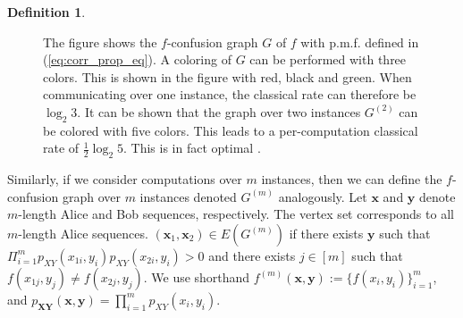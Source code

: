 \documentclass[journal, onecolumn, draftcls]{IEEEtran}
\theoremstyle{definition}
\newtheorem{definition}{Definition}
\newcommand{\vs}{\vspace{-0.1in}}
\newcommand{\bfy}{\mathbf{y}}
\newcommand{\bfX}{\mathbf{X}}
\newcommand{\bfY}{\mathbf{Y}}
\newcommand{\bfx}{\mathbf{x}}
\begin{document}
\begin{definition}
\begin{figure}[!t]
\begin{center}
\end{center}
\vs
\caption{\label{fig:pentagon} {\small The figure shows the $f$-confusion graph $G$ of $f$ with p.m.f. defined in (\ref{eq:corr_prop_eq}). A coloring of $G$ can be performed with three colors. This is shown in the figure with red, black and green. When communicating over one instance, the classical rate can therefore be $\log_2 3$. It can be shown that the graph over two instances $G^{(2)}$ can be colored with five colors. This leads to a per-computation classical rate of $\frac{1}{2} \log_2 5$. This is in fact optimal \cite{Witsenhausen_76,lovasz1979shannon}.}}
\vs
\end{figure}


Similarly, if we consider computations over $m$ instances, then we can define the $f$-confusion graph over $m$ instances denoted $G^{(m)}$ analogously. Let $\bfx$ and $\bfy$ denote $m$-length Alice and Bob sequences, respectively. The vertex set corresponds to all $m$-length Alice sequences. $(\bfx_1,\bfx_2) \in E(G^{(m)})$ if there exists $\bfy$ such that $\Pi_{i=1}^m p_{XY}(x_{1i},y_i) p_{XY}(x_{2i}, y_i) > 0$ and there exists $j \in [m]$ such that $f(x_{1j},y_j) \neq f(x_{2j},y_j)$. %
We use shorthand $f^{(m)}(\bfx,\bfy):= \{f(x_i,y_i)\}_{i=1}^m$, and $p_{\bfX\bfY}(\bfx,\bfy)= \prod_{i=1}^mp_{XY}(x_i,y_i)$.
\end{definition} 
\end{document}
